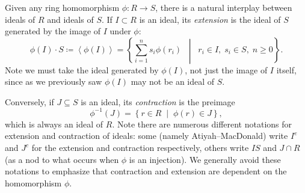 \documentclass[12pt,reqno]{amsart}
\begin{document}
\hrulefill

Given any ring homomorphism $\phi: R\to S$, there is a natural interplay between ideals of $R$ and ideals of $S$. If $I\subset R$ is an ideal, its \emph{extension} is the ideal of $S$ generated by the image of $I$ under $\phi$:
\[
\phi(I)\cdot S \coloneqq \left \langle \phi(I) \right\rangle
= \left\{\sum_{i=1}^n s_i \phi(r_i) \;\; \middle|\;\; r_i\in I,\; s_i\in S,\; n\geq 0\right\}.
\]
Note we must take the ideal generated by $\phi(I)$, not just the image of $I$ itself, since as we previously saw $\phi(I)$ may not be an ideal of $S$.

Conversely, if $J\subseteq S$ is an ideal, its \emph{contraction} is the preimage
\[
\phi^{-1}(J) = \left\{r\in R\;\; \big|\;\; \phi(r)\in J\right\},
\]
which is always an ideal of $R$. Note there are numerous different notations for extension and contraction of ideals: some (namely Atiyah--MacDonald) write $I^{e}$ and $J^{c}$ for the extension and contraction respectively, others write $IS$ and $J\cap R$ (as a nod to what occurs when $\phi$ is an injection). We generally avoid these notations to emphasize that contraction and extension are dependent on the homomorphism $\phi$.

\hrulefill
\end{document}
